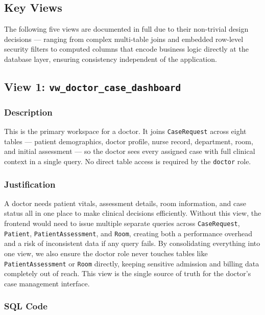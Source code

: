 \documentclass{article}
\begin{document}
\newpage
\subsection{Key Views}

The following five views are documented in full due to their non-trivial design decisions --- ranging from complex multi-table joins and embedded row-level security filters to computed columns that encode business logic directly at the database layer, ensuring consistency independent of the application.

\subsection{View 1: \texttt{vw\_doctor\_case\_dashboard}}

\subsubsection{Description}
This is the primary workspace for a doctor. It joins \texttt{CaseRequest} across eight tables --- patient demographics, doctor profile, nurse record, department, room, and initial assessment --- so the doctor sees every assigned case with full clinical context in a single query. No direct table access is required by the \texttt{doctor} role.

\subsubsection{Justification}
A doctor needs patient vitals, assessment details, room information, and case status all in one place to make clinical decisions efficiently. Without this view, the frontend would need to issue multiple separate queries across \texttt{CaseRequest}, \texttt{Patient}, \texttt{PatientAssessment}, and \texttt{Room}, creating both a performance overhead and a risk of inconsistent data if any query fails. By consolidating everything into one view, we also ensure the doctor role never touches tables like \texttt{PatientAssessment} or \texttt{Room} directly, keeping sensitive admission and billing data completely out of reach. This view is the single source of truth for the doctor's case management interface.

\subsubsection{SQL Code}
\end{document}
